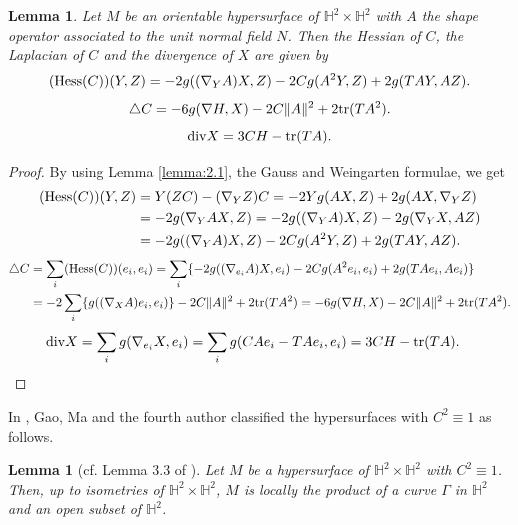 \documentclass[reqno]{amsart}%
\newtheorem{lemma}[theorem]{Lemma}
\theoremstyle{definition}
\numberwithin{equation}{section}
\begin{document}
\begin{lemma}\label{lemma:2.1aaa}
Let $M$ be an orientable hypersurface of $\mathbb{H}^2\times\mathbb{H}^2$
with $A$ the shape operator associated
to the unit normal field $N$. Then the Hessian of $C$,
the Laplacian of $C$ and the divergence of $X$ are given by
%
\begin{equation}\label{eqn:2.4aaa}
({\rm Hess}(C))(Y,Z)=-2g((\nabla_Y A)X,Z)-2Cg(A^2Y,Z)+2g(TAY,AZ).
\end{equation}
%
\begin{equation}\label{eqn:2.5aaa}
\triangle C=-6g(\nabla H,X)-2C\|A\|^2+2{\rm tr}(TA^2).
\end{equation}
%
\begin{equation}\label{eqn:2.6aaa}
{\rm div}X=3CH-{\rm tr}(TA).
\end{equation}
\end{lemma}
%
\begin{proof}
%
By using Lemma \ref{lemma:2.1}, the Gauss and Weingarten formulae, we get
\begin{align*}
({\rm Hess}(C))(Y,Z)&=Y(ZC)-(\nabla_YZ)C=-2Yg(AX,Z)+2g(AX,\nabla_YZ)\\
&=-2g(\nabla_Y{AX},Z)=-2g((\nabla_YA)X,Z)-2g(\nabla_Y X,AZ)\\
&=-2g((\nabla_Y A)X,Z)-2Cg(A^2Y,Z)+2g(TAY,AZ).
\end{align*}
%
\begin{align*}
\triangle C&=\sum_i({\rm Hess}(C))(e_i,e_i)
=\sum_i\{-2g((\nabla_{e_i} A)X,{e_i})-2Cg(A^2{e_i},{e_i})+2g(TA{e_i},A{e_i})\}\\
&=-2\sum_i\{g((\nabla_X A){e_i},{e_i})\}-2C\|A\|^2+2{\rm tr}(TA^2)
=-6g(\nabla H,X)-2C\|A\|^2+2{\rm tr}(TA^2).
\end{align*}
%
\begin{align*}
{\rm div}X&=\sum_ig(\nabla_{e_i}X,e_i)=\sum_ig(CAe_i-TAe_i,e_i)
=3CH-{\rm tr}(TA).
\end{align*}
\end{proof}

In \cite{GMY}, Gao, Ma and the fourth author classified the hypersurfaces with $C^2\equiv 1$ as follows.
%
\begin{lemma}[cf. Lemma 3.3 of \cite{GMY}]\label{lem:2.2}
Let $M$ be a hypersurface of $\mathbb{H}^2\times\mathbb{H}^2$ with $C^2\equiv 1$.
Then, up to isometries of $\mathbb{H}^2\times\mathbb{H}^2$, $M$ is locally the
product of a curve $\Gamma$ in $\mathbb{H}^2$ and an open
subset of $\mathbb{H}^2$.
\end{lemma}
\end{document}
